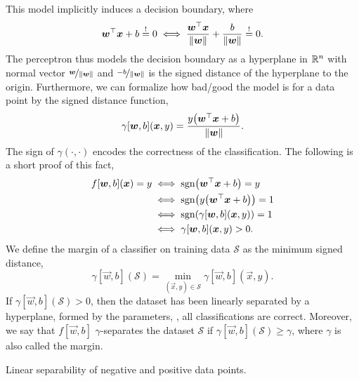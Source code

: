 This model implicitly induces a decision boundary, where \[
    \transpose{\vec{w}} \vec{x} + b \condeq 0 \iff \frac{\transpose{\vec{w}}\vec{x}}{\| \vec{w} \|} + \frac{b}{\| \vec{w} \|} \condeq 0.
\]
The perceptron thus models the decision boundary as a hyperplane in $\R^n$ with normal vector
$\nicefrac{\vec{w}}{\| \vec{w} \|}$ and $\nicefrac{-b}{\| \vec{w} \|}$ is the signed distance of
the hyperplane to the origin. Furthermore, we can formalize how bad/good the model is for a data point by the signed
distance function, \[
    \gamma[\vec{w}, b](\vec{x}, y) = \frac{y \lft( \transpose{\vec{w}} \vec{x} + b \rgt)}{\| \vec{w} \|}.
\]
The sign of $\gamma(\cdot, \cdot)$ encodes the correctness of the classification. The following is
a short proof of this fact,
\begin{align*}
    f[\vec{w}, b](\vec{x}) = y & \iff \mathrm{sgn}\lft( \transpose{\vec{w}} \vec{x} + b \rgt) = y               \\
                               & \iff \mathrm{sgn}\lft( y \lft( \transpose{\vec{w}} \vec{x} + b \rgt) \rgt) = 1 \\
                               & \iff \mathrm{sgn}\lft( \gamma[\vec{w}, b](\vec{x}, y) \rgt) = 1                \\
                               & \iff \gamma[\vec{w}, b](\vec{x}, y) > 0.
\end{align*}
We define the margin of a classifier on training data $\mathcal{S}$ as the minimum signed distance, \[
    \gamma[\vec{w}, b](\mathcal{S}) = \min_{(\vec{x}, y) \in \mathcal{S}} \gamma[\vec{w},b](\vec{x}, y).
\]
If $\gamma[\vec{w},b](\mathcal{S}) > 0$, then the dataset has been linearly separated by a
hyperplane, formed by the parameters, \ie, all classifications are correct. Moreover, we say that
$f[\vec{w}, b]$ $\gamma$-separates the dataset $\mathcal{S}$ if $\gamma[\vec{w}, b](\mathcal{S})
    \geq \gamma$, where $\gamma$ is also called the margin.

\begin{marginfigure}
    \centering
    \caption{Linear separability of negative and positive data points.}
    \label{fig:linear-separability}
\end{marginfigure}

